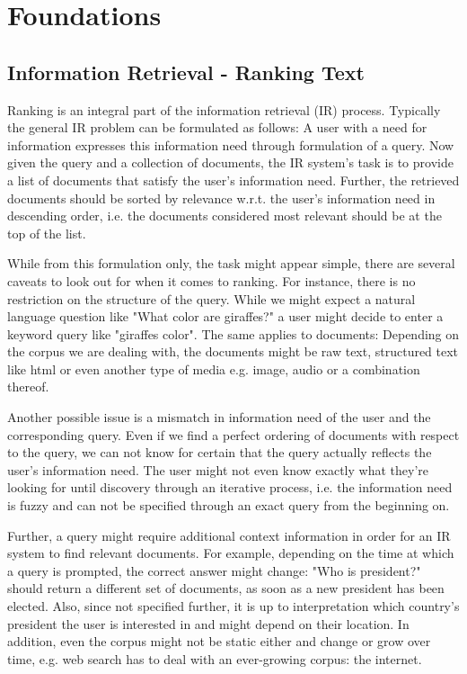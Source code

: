\chapter{Foundations}
\label{foundations}
\section{Information Retrieval - Ranking Text}
Ranking is an integral part of the information retrieval (IR) process. Typically the general IR problem can be formulated as follows: A user with a need for information expresses this information need through formulation of a query. Now given the query and a collection of documents, the IR system's task is to provide a list of documents that satisfy the user's information need. Further, the retrieved documents should be sorted by relevance w.r.t. the user's information need in descending order, i.e. the documents considered most relevant should be at the top of the list.

While from this formulation only, the task might appear simple, there are several caveats to look out for when it comes to ranking. For instance, there is no restriction on the structure of the query. While we might expect a natural language question like "What color are giraffes?" a user might decide to enter a keyword query like "giraffes color". The same applies to documents: Depending on the corpus we are dealing with, the documents might be raw text, structured text like html or even another type of media e.g. image, audio or a combination thereof.

Another possible issue is a mismatch in information need of the user and the corresponding query. Even if we find a perfect ordering of documents with respect to the query, we can not know for certain that the query actually reflects the user's information need. The user might not even know exactly what they're looking for until discovery through an iterative process, i.e. the information need is fuzzy and can not be specified through an exact query from the beginning on.

Further, a query might require additional context information in order for an IR system to find relevant documents. For example, depending on the time at which a query is prompted, the correct answer might change: "Who is president?" should return a different set of documents, as soon as a new president has been elected. Also, since not specified further, it is up to interpretation which country's president the user is interested in and might depend on their location.
In addition, even the corpus might not be static either and change or grow over time, e.g. web search has to deal with an ever-growing corpus: the internet.

